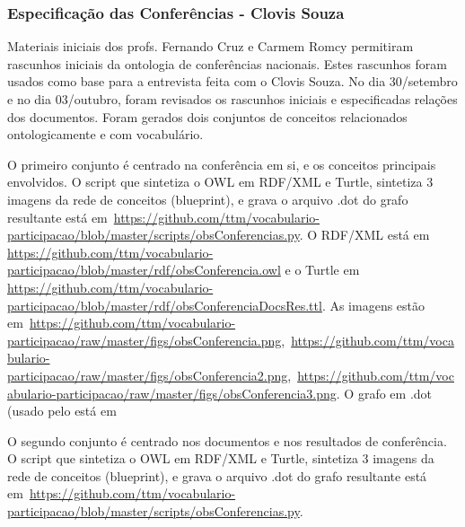 \documentclass[12pt]{article}
\begin{document}
\subsubsection{Especificação das Conferências - Clovis Souza}
Materiais iniciais dos profs. Fernando Cruz e Carmem Romcy permitiram rascunhos iniciais da ontologia de conferências nacionais. Estes rascunhos foram usados como base para a entrevista feita com o Clovis Souza. No dia 30/setembro e no dia 03/outubro, foram revisados os rascunhos iniciais e especificadas relações dos documentos. Foram gerados dois conjuntos de conceitos relacionados ontologicamente e com vocabulário.

O primeiro conjunto é centrado na conferência em si, e os conceitos principais envolvidos. O script que sintetiza o OWL em RDF/XML e Turtle, sintetiza 3 imagens da rede de conceitos (blueprint), e grava o arquivo .dot do grafo resultante está em~\url{https://github.com/ttm/vocabulario-participacao/blob/master/scripts/obsConferencias.py}. O RDF/XML está em \url{https://github.com/ttm/vocabulario-participacao/blob/master/rdf/obsConferencia.owl} e o Turtle em \url{https://github.com/ttm/vocabulario-participacao/blob/master/rdf/obsConferenciaDocsRes.ttl}. As imagens estão em~\url{https://github.com/ttm/vocabulario-participacao/raw/master/figs/obsConferencia.png},~\url{https://github.com/ttm/vocabulario-participacao/raw/master/figs/obsConferencia2.png},~\url{https://github.com/ttm/vocabulario-participacao/raw/master/figs/obsConferencia3.png}. O grafo em .dot (usado pelo está em

O segundo conjunto é centrado nos documentos e nos resultados de conferência.  O script que sintetiza o OWL em RDF/XML e Turtle, sintetiza 3 imagens da rede de conceitos (blueprint), e grava o arquivo .dot do grafo resultante está em~\url{https://github.com/ttm/vocabulario-participacao/blob/master/scripts/obsConferencias.py}.

\end{document}
